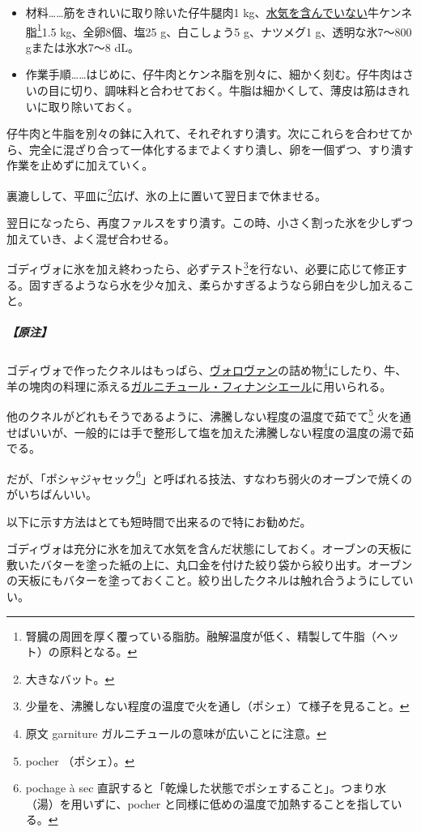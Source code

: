 \begin{recette}
\begin{itemize}
\item
  材料\ldots{}\ldots{}筋をきれいに取り除いた仔牛腿肉1
  kg、\ul{水気を含んでいない}牛ケンネ脂\footnote{腎臓の周囲を厚く覆っている脂肪。融解温度が低く、精製して牛脂（ヘット）の原料となる。}1.5
  kg、全卵8個、塩25 g、白こしょう5 g、ナツメグ1 g、透明な氷7〜800
  gまたは氷水7〜8 dL。
\item
  作業手順\ldots{}\ldots{}はじめに、仔牛肉とケンネ脂を別々に、細かく刻む。仔牛肉はさいの目に切り、調味料と合わせておく。牛脂は細かくして、薄皮は筋はきれいに取り除いておく。
\end{itemize}

仔牛肉と牛脂を別々の鉢に入れて、それぞれすり潰す。次にこれらを合わせてから、完全に混ざり合って一体化するまでよくすり潰し、卵を一個ずつ、すり潰す作業を止めずに加えていく。

裏漉しして、平皿に\footnote{大きなバット。}広げ、氷の上に置いて翌日まで休ませる。

翌日になったら、再度ファルスをすり潰す。この時、小さく割った氷を少しずつ加えていき、よく混ぜ合わせる。

ゴディヴォに氷を加え終わったら、必ずテスト\footnote{少量を、沸騰しない程度の温度で火を通し（ポシェ）て様子を見ること。}を行ない、必要に応じて修正する。固すぎるようなら水を少々加え、柔らかすぎるようなら卵白を少し加えること。

\hypertarget{nota-godiveau-a}{%
\subparagraph{【原注】}\label{nota-godiveau-a}}

ゴディヴォで作ったクネルはもっぱら、\protect\hyperlink{vol-au-vent}{ヴォロヴァン}の詰め物\footnote{原文
  garniture ガルニチュールの意味が広いことに注意。}にしたり、牛、羊の塊肉の料理に添える\protect\hyperlink{garniture-a-la-financiere}{ガルニチュール・フィナンシエール}に用いられる。

他のクネルがどれもそうであるように、沸騰しない程度の温度で茹でて\footnote{pocher
  （ポシェ）。}
火を通せばいいが、一般的には手で整形して塩を加えた沸騰しない程度の温度の湯で茹でる。

だが、「ポシャジャセック\footnote{pochage à sec
  直訳すると「乾燥した状態でポシェすること」。つまり水（湯）を用いずに、pocher
  と同様に低めの温度で加熱することを指している。}」と呼ばれる技法、すなわち弱火のオーブンで焼くのがいちばんいい。

以下に示す方法はとても短時間で出来るので特にお勧めだ。

ゴディヴォは充分に氷を加えて水気を含んだ状態にしておく。オーブンの天板に敷いたバターを塗った紙の上に、丸口金を付けた絞り袋から絞り出す。オーブンの天板にもバターを塗っておくこと。絞り出したクネルは触れ合うようにしていい。


\end{recette}
